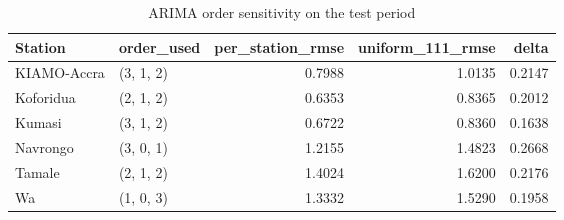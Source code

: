 \begin{table}[H]
\centering
\caption{ARIMA order sensitivity on the test period}
\label{tab:arima-order}
\begin{singlespace}
\begin{tabular}{llrrr}
\toprule
Station & order\_used & per\_station\_rmse & uniform\_111\_rmse & delta \\
\midrule
KIAMO-Accra & (3, 1, 2) & 0.7988 & 1.0135 & 0.2147 \\
Koforidua & (2, 1, 2) & 0.6353 & 0.8365 & 0.2012 \\
Kumasi & (3, 1, 2) & 0.6722 & 0.8360 & 0.1638 \\
Navrongo & (3, 0, 1) & 1.2155 & 1.4823 & 0.2668 \\
Tamale & (2, 1, 2) & 1.4024 & 1.6200 & 0.2176 \\
Wa & (1, 0, 3) & 1.3332 & 1.5290 & 0.1958 \\
\bottomrule
\end{tabular}
\end{singlespace}
\end{table}

